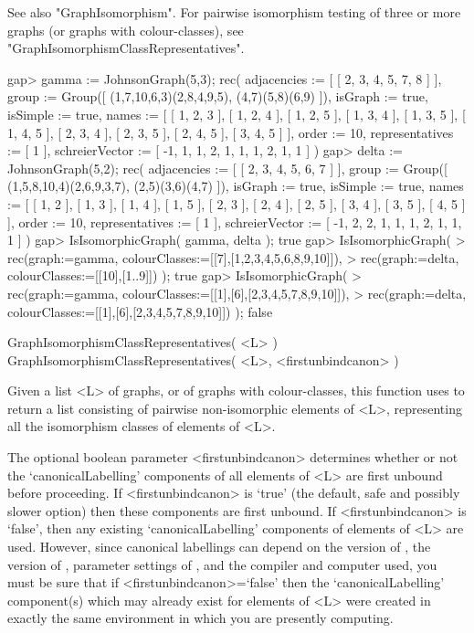 See also "GraphIsomorphism".  For pairwise isomorphism testing
of three or more graphs (or graphs with colour-classes), see
"GraphIsomorphismClassRepresentatives".

\beginexample
gap> gamma := JohnsonGraph(5,3);
rec( adjacencies := [ [ 2, 3, 4, 5, 7, 8 ] ], 
  group := Group([ (1,7,10,6,3)(2,8,4,9,5), (4,7)(5,8)(6,9) ]), 
  isGraph := true, isSimple := true, 
  names := [ [ 1, 2, 3 ], [ 1, 2, 4 ], [ 1, 2, 5 ], [ 1, 3, 4 ], [ 1, 3, 5 ], 
      [ 1, 4, 5 ], [ 2, 3, 4 ], [ 2, 3, 5 ], [ 2, 4, 5 ], [ 3, 4, 5 ] ], 
  order := 10, representatives := [ 1 ], 
  schreierVector := [ -1, 1, 1, 2, 1, 1, 1, 2, 1, 1 ] )
gap> delta := JohnsonGraph(5,2);
rec( adjacencies := [ [ 2, 3, 4, 5, 6, 7 ] ], 
  group := Group([ (1,5,8,10,4)(2,6,9,3,7), (2,5)(3,6)(4,7) ]), 
  isGraph := true, isSimple := true, 
  names := [ [ 1, 2 ], [ 1, 3 ], [ 1, 4 ], [ 1, 5 ], [ 2, 3 ], [ 2, 4 ], 
      [ 2, 5 ], [ 3, 4 ], [ 3, 5 ], [ 4, 5 ] ], order := 10, 
  representatives := [ 1 ], schreierVector := [ -1, 2, 2, 1, 1, 1, 2, 1, 1, 1 
     ] )
gap> IsIsomorphicGraph( gamma, delta );
true
gap> IsIsomorphicGraph( 
>       rec(graph:=gamma, colourClasses:=[[7],[1,2,3,4,5,6,8,9,10]]), 
>       rec(graph:=delta, colourClasses:=[[10],[1..9]]) ); 
true
gap> IsIsomorphicGraph( 
>       rec(graph:=gamma, colourClasses:=[[1],[6],[2,3,4,5,7,8,9,10]]), 
>       rec(graph:=delta, colourClasses:=[[1],[6],[2,3,4,5,7,8,9,10]]) ); 
false
\endexample


\>GraphIsomorphismClassRepresentatives( <L> )
\>GraphIsomorphismClassRepresentatives( <L>, <firstunbindcanon> )

Given a list <L> of graphs, or of graphs with colour-classes,
this function uses {\nauty} to return a list consisting of pairwise
non-isomorphic elements of <L>, representing all the isomorphism classes
of elements of <L>.

The optional boolean parameter <firstunbindcanon> determines whether
or not the `canonicalLabelling' components of all elements of <L>
are first unbound before proceeding.  If <firstunbindcanon> is `true'
(the default, safe and possibly slower option) then these components
are first unbound.  If <firstunbindcanon> is `false', then any existing
`canonicalLabelling' components of elements of <L> are used.  However,
since canonical labellings can depend on the version of {\nauty}, the
version of {\GRAPE}, parameter settings of {\nauty}, and the compiler
and computer used, you must be sure that if <firstunbindcanon>=`false'
then the `canonicalLabelling' component(s) which may already exist for
elements of <L> were created in exactly the same environment in which
you are presently computing.

